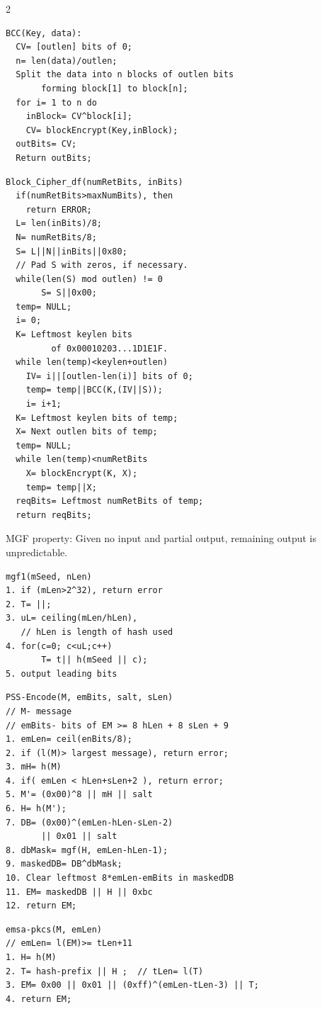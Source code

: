 \begin{multicols} {2}
{\begin{verbatim}
BCC(Key, data):
  CV= [outlen] bits of 0;
  n= len(data)/outlen;
  Split the data into n blocks of outlen bits 
       forming block[1] to block[n];
  for i= 1 to n do
    inBlock= CV^block[i];
    CV= blockEncrypt(Key,inBlock);
  outBits= CV;
  Return outBits;
\end{verbatim}

\begin{verbatim}
Block_Cipher_df(numRetBits, inBits)
  if(numRetBits>maxNumBits), then 
    return ERROR;
  L= len(inBits)/8;
  N= numRetBits/8;
  S= L||N||inBits||0x80;
  // Pad S with zeros, if necessary.
  while(len(S) mod outlen) != 0
       S= S||0x00;
  temp= NULL;
  i= 0;
  K= Leftmost keylen bits 
         of 0x00010203...1D1E1F.
  while len(temp)<keylen+outlen)
    IV= i||[outlen-len(i)] bits of 0;
    temp= temp||BCC(K,(IV||S));
    i= i+1;
  K= Leftmost keylen bits of temp;
  X= Next outlen bits of temp;
  temp= NULL;
  while len(temp)<numRetBits
    X= blockEncrypt(K, X);
    temp= temp||X;
  reqBits= Leftmost numRetBits of temp;
  return reqBits;
\end{verbatim}
MGF property:  Given no input and partial output, remaining output is unpredictable.
\begin{verbatim}
mgf1(mSeed, nLen)
1. if (mLen>2^32), return error
2. T= ||;
3. uL= ceiling(mLen/hLen), 
   // hLen is length of hash used
4. for(c=0; c<uL;c++)
       T= t|| h(mSeed || c);
5. output leading bits
\end{verbatim}
\begin{verbatim}
PSS-Encode(M, emBits, salt, sLen)
// M- message
// emBits- bits of EM >= 8 hLen + 8 sLen + 9
1. emLen= ceil(enBits/8);
2. if (l(M)> largest message), return error;
3. mH= h(M)
4. if( emLen < hLen+sLen+2 ), return error;
5. M'= (0x00)^8 || mH || salt
6. H= h(M');
7. DB= (0x00)^(emLen-hLen-sLen-2) 
       || 0x01 || salt
8. dbMask= mgf(H, emLen-hLen-1);
9. maskedDB= DB^dbMask;
10. Clear leftmost 8*emLen-emBits in maskedDB
11. EM= maskedDB || H || 0xbc
12. return EM;
\end{verbatim}
\begin{verbatim}
emsa-pkcs(M, emLen)
// emLen= l(EM)>= tLen+11
1. H= h(M)
2. T= hash-prefix || H ;  // tLen= l(T)
3. EM= 0x00 || 0x01 || (0xff)^(emLen-tLen-3) || T;
4. return EM;
\end{verbatim}
}
\end{multicols}

